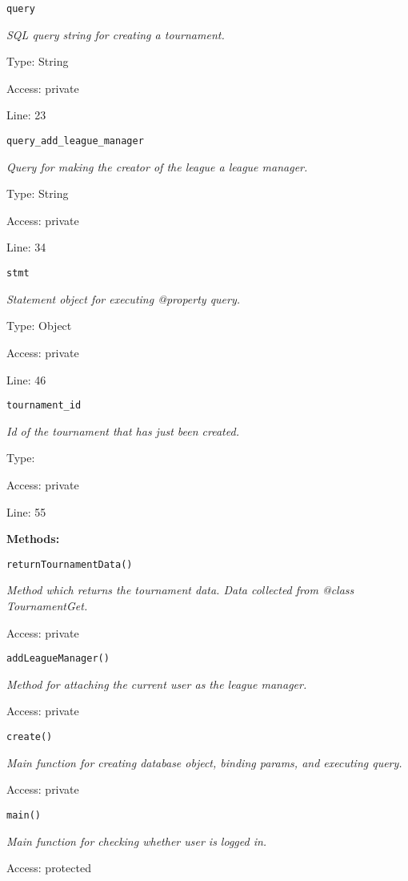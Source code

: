 \texttt{query}

{\scriptsize
\textit{SQL query string for creating a tournament.}

Type: String

Access: private

Line: 23

}
\texttt{query\_add\_league\_manager}

{\scriptsize
\textit{Query for making the creator of the league a league manager.}

Type: String

Access: private

Line: 34

}
\texttt{stmt}

{\scriptsize
\textit{Statement object for executing @property query.}

Type: Object

Access: private

Line: 46

}
\texttt{tournament\_id}

{\scriptsize
\textit{Id of the tournament that has just been created.}

Type: 

Access: private

Line: 55

}
\textbf{Methods:}

\texttt{returnTournamentData()}

{\scriptsize
\textit{Method which returns the tournament data.
Data collected from @class TournamentGet.}

Access: private

}

\texttt{addLeagueManager()}

{\scriptsize
\textit{Method for attaching the current user as the league manager.}

Access: private

}

\texttt{create()}

{\scriptsize
\textit{Main function for creating database object, binding params, and executing query.}

Access: private

}

\texttt{main()}

{\scriptsize
\textit{Main function for checking whether user is logged in.}

Access: protected

}

